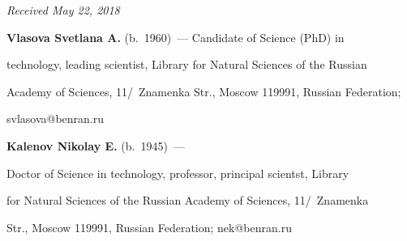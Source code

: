\vspace*{-3pt}



\hfill{\small\textit{Received May 22, 2018}}



\vspace*{-9pt}



\Contr



\noindent

\textbf{Vlasova Svetlana A.} (b.\ 1960)~--- Candidate of Science (PhD) in 

technology, leading scientist, Library for Natural Sciences of the Russian 

Academy of Sciences, 11\!/~Znamenka Str., Moscow 119991, Russian Federation; 

\mbox{svlasova@benran.ru}



\vspace*{3pt}



\noindent

\textbf{Kalenov Nikolay E.} (b.\ 1945)~---  

Doctor of Science in technology, professor, principal scientst, Library 

for Natural Sciences of the Russian Academy of Sciences, 11\!/~Znamenka 

Str., Moscow 119991, Russian Federation;  \mbox{nek@benran.ru}







\label{end\stat}





\renewcommand{\bibname}{\protect\rm Литература}

